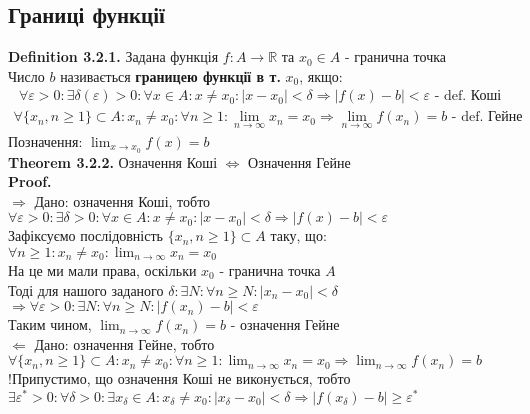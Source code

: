 \documentclass[a4paper, 14pt]{extarticle}
\def\huge{\displaystyle}
\def\bigline{\vspace{5mm}\\}
\def\defin#1{\textbf{Definition {#1}}}
\def\th#1{\textbf{Theorem {#1}}}
\def\proof{\textbf{Proof.}\\}
\def\bigline{\vspace{5mm}\\}
\begin{document}
	
	\subsection{Границі функції}
	\defin{3.2.1.} Задана функція $f: A \to \mathbb{R}$ та $x_0 \in A$ - гранична точка\\
	Число $b$ називається \textbf{границею функції в т.} $x_0$, якщо:
	\begin{align*}
	\forall \varepsilon > 0: \exists \delta(\varepsilon) > 0: \forall x \in A: x \neq x_0: |x-x_0|<\delta \Rightarrow |f(x)-b|<\varepsilon \textrm{ - def. Коші}
	\end{align*}
	\begin{align*}
	\forall \{x_n, n \geq 1\}\subset A: x_n \neq x_0: \forall n \geq 1: \lim_{n \to \infty} x_n = x_0 \Rightarrow \lim_{n \to \infty} f(x_n) = b \textrm{ - def. Гейне}
	\end{align*}
	Позначення: $\huge \lim_{x \to x_0} f(x) = b$ \bigline
	\th{3.2.2.} Означення Коші $\iff$ Означення Гейне\\
	\proof
	$\boxed{\Rightarrow}$ Дано: означення Коші, тобто\\
	$\forall \varepsilon > 0: \exists \delta > 0: \forall x \in A: x \neq x_0: |x-x_0|<\delta \Rightarrow |f(x)-b|<\varepsilon$\\
	Зафіксуємо послідовність $\{x_n, n \geq 1\} \subset A$ таку, що:\\
	$\forall n \geq 1: x_n \neq x_0: \huge \lim_{n \to \infty} x_n = x_0$\\
	На це ми мали права, оскільки $x_0$ - гранична точка $A$\\
	Тоді для нашого заданого $\delta: \exists N: \forall n \geq N: |x_n - x_0| < \delta$\\
	$\Rightarrow \forall \varepsilon > 0: \exists N: \forall n \geq N: |f(x_n) - b| < \varepsilon$\\
	Таким чином, $\huge \lim_{n \to \infty} f(x_n) = b$ - означення Гейне
	\bigline
	$\boxed{\Leftarrow}$ Дано: означення Гейне, тобто\\
	$\huge \forall \{x_n, n \geq 1\}\subset A: x_n \neq x_0: \forall n \geq 1: \lim_{n \to \infty} x_n = x_0 \Rightarrow \lim_{n \to \infty} f(x_n) = b$\\
	!Припустимо, що означення Коші не виконується, тобто\\
	$\exists \varepsilon^*>0: \forall \delta > 0: \exists x_{\delta} \in A: x_{\delta} \neq x_{0}: |x_{\delta} - x_0| < \delta \Rightarrow |f(x_{\delta}) - b| \geq \varepsilon^*$\\
\end{document}
